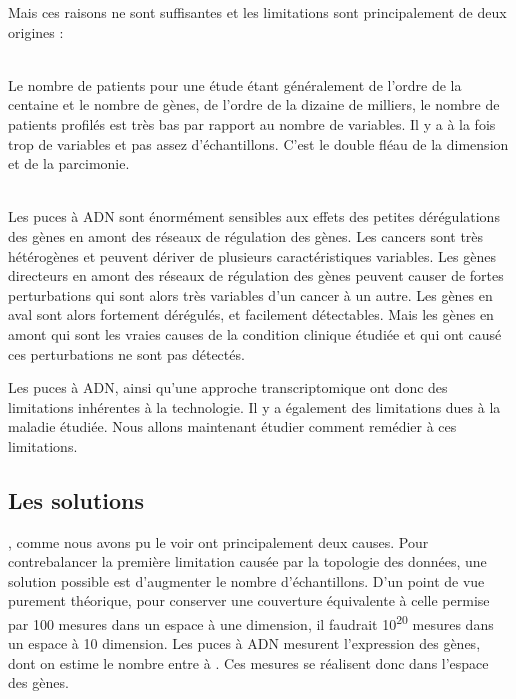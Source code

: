 			 Mais ces raisons ne sont suffisantes et les limitations sont principalement de deux origines :
			\begin{description}\label{def:limitations}
				\item [La topologie des données]   \hfill \\
					Le nombre de patients pour une étude étant généralement de l'ordre de la centaine et le nombre de gènes, de l'ordre de la dizaine de milliers, le nombre de patients profilés est très bas par rapport au nombre de variables.
					Il y a à la fois trop de variables et pas assez d'échantillons.
					C'est le double fléau de la dimension et de la parcimonie.
				\item [La biologie du cancer]      \hfill \\
					Les puces à \acs{ADN} sont énormément sensibles aux effets des petites dérégulations des gènes en amont des réseaux de régulation des gènes.
					Les cancers sont très hétérogènes et peuvent dériver de plusieurs caractéristiques variables.
					Les gènes directeurs en amont des réseaux de régulation des gènes peuvent causer de fortes perturbations qui sont alors très variables d'un cancer à un autre.
					Les gènes en aval sont alors fortement dérégulés, et facilement détectables.
					Mais les gènes en amont qui sont les vraies causes de la condition clinique étudiée et qui ont causé ces perturbations ne sont pas détectés.
			\end{description}
			\vspace{1.5ex}

			Les puces à \acs{ADN}, ainsi qu'une approche transcriptomique ont donc des limitations inhérentes à la technologie.
			Il y a également des limitations dues à la maladie étudiée.
			Nous allons maintenant étudier comment remédier à ces limitations.

		\subsection{\textcolor{red!45!black}{Les solutions}}

			, comme nous avons pu le voir ont principalement deux causes.
			Pour contrebalancer la première limitation causée par la topologie des données, une solution possible est d'augmenter le nombre d'échantillons.
			D'un point de vue purement théorique, pour conserver une couverture équivalente à celle permise par 100 mesures dans un espace à une dimension, il faudrait 10\textsuperscript{20} mesures dans un espace à 10 dimension.
			Les puces à \acs{ADN} mesurent l'expression des gènes, dont on estime le nombre entre  à .
			Ces mesures se réalisent donc dans l'espace des gènes.


